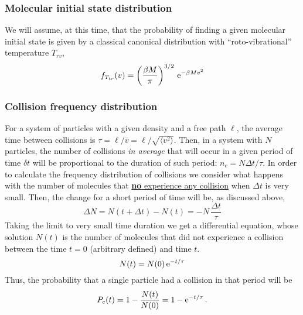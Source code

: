 \subsubsection{Molecular initial state distribution}

We will assume, at this time, that the probability of finding a given molecular initial state is given by a classical canonical distribution with ``roto-vibrational'' temperature $T_{rv}$,
\begin{equation}
  \label{Q:rates-rotovib-distrib}
  f_{T_{tr}}(v) = \left( \frac{\beta M}{\pi} \right)^{3/2} \, \mathrm{e}^{- \beta M v^{2}}
\end{equation}

\subsubsection{Collision frequency distribution}

For a system of particles with a given density and a free path $\ell$, the average time between collisions is $\tau = \ell/\overline{v}= \ell/ \sqrt{\langle v^{2} \rangle}$. Then, in a system with $N$ particles, the number of collisions \emph{in average} that will occur in a given period of time $\delta t$ will be proportional to the duration of such period: $n_{c} = N \Delta t/\tau$. In order to calculate the frequency distribution of collisions we consider what happens with the number of molecules that \underline{\textbf{no} experience any collision} when $\Delta t$ is very small. Then, the change for a short period of time will be, as discussed above,
\begin{equation}
  \label{Q:rates-freq-collision-diff}
  \Delta N = N(t+\Delta t) - N(t) = - N \, \frac{\Delta t}{\tau}
\end{equation}
Taking the limit to very small time duration we get a differential equation, whose solution $N(t)$ is the number of molecules that did not experience a collision between the time $t=0$ (arbitrary defined) and time $t$. 
\begin{equation}
  \label{Q:rates-freq-collision-no-col}
  N(t) = N(0)\, \mathrm{e}^{-t/\tau}
\end{equation}
Thus, the probability that a single particle had a collision in that period will be 
\begin{equation}
  \label{Q:rates-freq-collision-prob-dist}
  P_{c}(t) = 1- \frac{N(t)}{N(0)} = 1 - \mathrm{e}^{-t/\tau} \,.
\end{equation}


